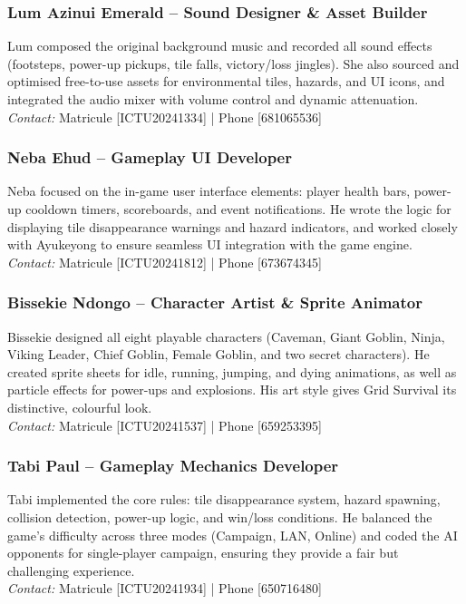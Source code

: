 \documentclass[12pt,a4paper]{article}
\begin{document}
\subsubsection*{Lum Azinui Emerald – Sound Designer \& Asset Builder}
Lum composed the original background music and recorded all sound effects (footsteps, power-up pickups, tile falls, victory/loss jingles). She also sourced and optimised free-to-use assets for environmental tiles, hazards, and UI icons, and integrated the audio mixer with volume control and dynamic attenuation. \\
\textit{Contact:} Matricule [ICTU20241334] | Phone [681065536]

\subsubsection*{Neba Ehud – Gameplay UI Developer}
Neba focused on the in-game user interface elements: player health bars, power-up cooldown timers, scoreboards, and event notifications. He wrote the logic for displaying tile disappearance warnings and hazard indicators, and worked closely with Ayukeyong to ensure seamless UI integration with the game engine. \\
\textit{Contact:} Matricule [ICTU20241812] | Phone [673674345]

\subsubsection*{Bissekie Ndongo – Character Artist \& Sprite Animator}
Bissekie designed all eight playable characters (Caveman, Giant Goblin, Ninja, Viking Leader, Chief Goblin, Female Goblin, and two secret characters). He created sprite sheets for idle, running, jumping, and dying animations, as well as particle effects for power-ups and explosions. His art style gives Grid Survival its distinctive, colourful look. \\
\textit{Contact:} Matricule [ICTU20241537] | Phone [659253395]

\subsubsection*{Tabi Paul – Gameplay Mechanics Developer}
Tabi implemented the core rules: tile disappearance system, hazard spawning, collision detection, power-up logic, and win/loss conditions. He balanced the game’s difficulty across three modes (Campaign, LAN, Online) and coded the AI opponents for single-player campaign, ensuring they provide a fair but challenging experience. \\
\textit{Contact:} Matricule [ICTU20241934] | Phone [650716480]
\end{document}
